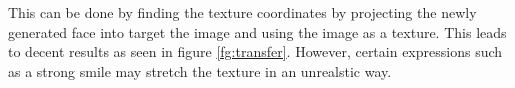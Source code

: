 \documentclass[11pt,a4paper,twoside]{report}
\begin{document}
This can be done by finding the texture coordinates by
projecting the newly generated face into target the image and using the image as
a texture. This leads to decent results as seen in figure
\ref{fg:transfer}. However, certain expressions such as a strong smile may stretch the
texture in an unrealstic way. 

\begin{figure}[H]
\centering
{}
\\

\end{figure}
\end{document}
